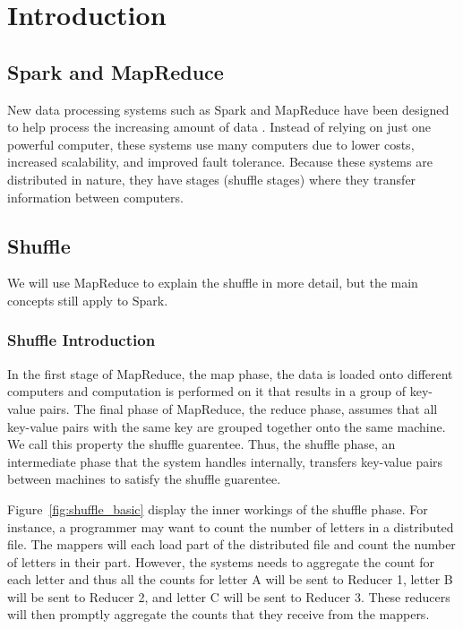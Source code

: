 \chapter{Introduction}\label{intro-ch}

\section{Spark and MapReduce}


New data processing systems such as Spark and MapReduce have been designed to help process the increasing amount of data \cite{MapReduce} \cite{Sparkfull}. 
Instead of relying on just one powerful computer, these systems use many computers due to lower costs, increased scalability, and improved fault tolerance. 
Because these systems are distributed in nature, they have stages (shuffle stages) where they transfer information between computers. 
\section{Shuffle} 

We will use MapReduce to explain the shuffle in more detail, but the main concepts still apply to Spark.

\subsection{Shuffle Introduction}
In the first stage of MapReduce, the map phase, the data is loaded onto different computers and computation is performed on it that results 
in a group of key-value pairs. The final phase of MapReduce, the reduce phase, assumes that all key-value pairs with the same
key are grouped together onto the same machine. We call this property the shuffle guarentee. Thus, the shuffle phase, an intermediate phase that the system handles internally, transfers key-value pairs between machines to satisfy the shuffle guarentee. 


Figure~\ref{fig:shuffle_basic} display the inner workings 
of the shuffle phase. For instance, a programmer may  want to count the 
number of letters in a distributed file. The mappers will each load part of the distributed file and count the number of
letters in their part. However, the systems needs to aggregate the count for each letter and 
thus all the counts for letter A will be sent to Reducer 1, letter B will be sent to Reducer 2,
and letter C will be sent to Reducer 3. These reducers will then promptly aggregate the counts that they receive from the 
mappers.

